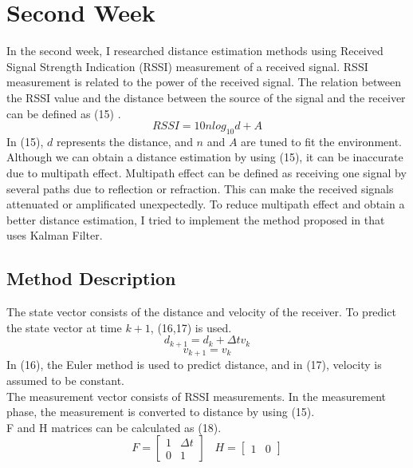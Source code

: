 \documentclass[12pt]{article}
\begin{document}
    \section{Second Week}
    In the second week, I researched distance estimation methods using 
    Received Signal Strength Indication (RSSI) measurement of a 
    received signal. RSSI measurement is related to the power of the 
    received signal. The relation between the RSSI value and the distance 
    between the source of the signal and the receiver can be defined 
    as (15) \cite{logmodel}.
    \begin{equation}\label{eq:15}
        RSSI = 10nlog_{10}d + A
    \end{equation}
    In (15), \(d\) represents the distance, and \(n\) and \(A\) are tuned to 
    fit the environment. Although we can obtain a distance estimation by 
    using (15), it can be inaccurate due to multipath effect. 
    Multipath effect can be defined as receiving one signal by several 
    paths due to reflection or refraction. This can make the received signals 
    attenuated or amplificated unexpectedly. To reduce multipath effect 
    and obtain a better distance estimation, I tried to implement the method 
    proposed in \cite{shue} that uses Kalman Filter.

    \subsection{Method Description}
    The state vector consists of the distance and velocity of the receiver. 
    To predict the state vector at time \(k+1\), (16,17) is used.
    \begin{equation}\label{eq:16}
        d_{k+1} = d_{k} + \Delta t v_{k}
    \end{equation}
    \begin{equation}\label{eq:17}
        v_{k+1} = v_{k}
    \end{equation}
    In (16), the Euler method is used to predict distance, and in (17), velocity 
    is assumed to be constant. \\
    The measurement vector consists of RSSI measurements. In the measurement phase, 
    the measurement is converted to distance by using (15).\\
    F and H matrices can be calculated as (18).
    \begin{equation}\label{eq:18}
        F = 
        \begin{bmatrix}
            1 & \Delta t\\
            0 & 1
        \end{bmatrix}\;\;\;
        H = 
        \begin{bmatrix}
            1 & 0
        \end{bmatrix}
    \end{equation}
\end{document}
